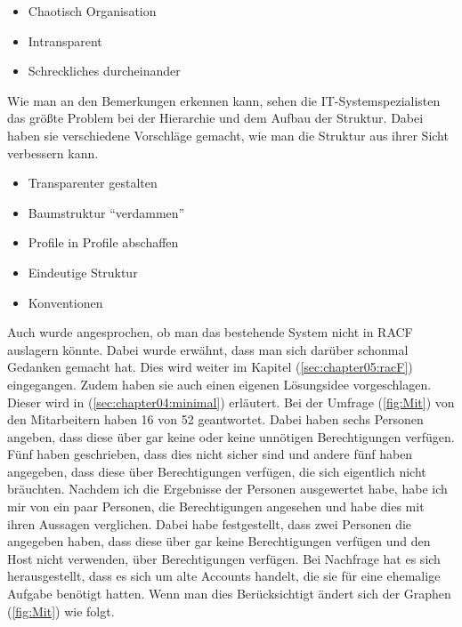 \begin{itemize}
	\item Chaotisch Organisation
	\item Intransparent
	\item Schreckliches durcheinander
\end{itemize}

Wie man an den Bemerkungen erkennen kann, sehen die IT-Systemspezialisten das größte Problem bei der Hierarchie und dem Aufbau der Struktur.
Dabei haben sie verschiedene Vorschläge gemacht, wie man die Struktur aus ihrer Sicht verbessern kann.

\begin{itemize}
	\item Transparenter gestalten
	\item Baumstruktur "`verdammen"'
	\item Profile in Profile abschaffen
	\item Eindeutige Struktur
	\item Konventionen
\end{itemize}
Auch wurde angesprochen, ob man das bestehende System nicht in RACF auslagern könnte.
Dabei wurde erwähnt, dass man sich darüber schonmal Gedanken gemacht hat.
Dies wird weiter im Kapitel (\ref{sec:chapter05:racF}) eingegangen.
Zudem haben sie auch einen eigenen Lösungsidee vorgeschlagen.
Dieser wird in (\ref{sec:chapter04:minimal}) erläutert.
\newline
\newline
Bei der Umfrage (\ref{fig:Mit}) von den Mitarbeitern haben 16 von 52 geantwortet.
Dabei haben sechs Personen angeben, dass diese über gar keine oder keine unnötigen Berechtigungen verfügen.
Fünf haben geschrieben, dass dies nicht sicher sind und andere fünf haben angegeben, dass diese über Berechtigungen verfügen, die sich eigentlich nicht bräuchten.
Nachdem ich die Ergebnisse der Personen ausgewertet habe, habe ich mir von ein paar Personen, die Berechtigungen angesehen und habe dies mit ihren Aussagen verglichen.
Dabei habe festgestellt, dass zwei Personen die angegeben haben, dass diese über gar keine Berechtigungen verfügen und den Host nicht verwenden, über Berechtigungen verfügen.
Bei Nachfrage hat es sich herausgestellt, dass es sich um alte Accounts handelt, die sie für eine ehemalige Aufgabe benötigt hatten.
Wenn man dies Berücksichtigt ändert sich der Graphen (\ref{fig:Mit}) wie folgt.
